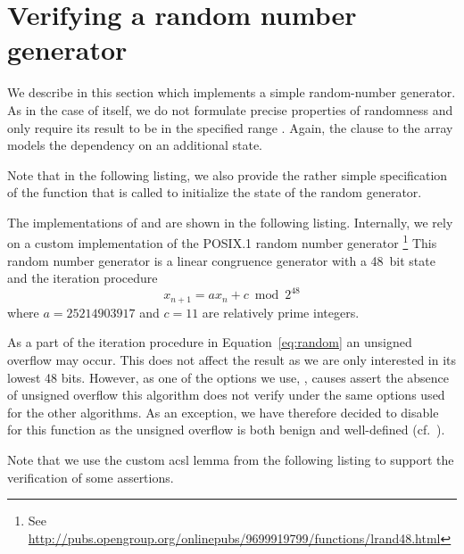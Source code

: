 
\section{Verifying a random number generator}

We describe in this section  which implements
a simple random-number generator.
As in the case of  itself, we do not formulate precise
properties of randomness and only require its result to
be in the specified range \inl{[0..n-1]}.
Again, the  clause to the array  models the
dependency on an additional state.

Note that in the following listing, we also provide the rather simple
specification of the function \randominit that is called to initialize the 
state of the random generator.



The implementations of \randomnumber and \randominit are shown in the following listing.
Internally, we rely on a custom implementation of the POSIX.1
random number generator \footnote{
  See \url{http://pubs.opengroup.org/onlinepubs/9699919799/functions/lrand48.html}
}
This random number generator is a linear congruence
generator with a 48~bit state and the iteration procedure
\begin{equation}
\label{eq:random}
x_{n+1}=ax_n+c\bmod 2^{48}
\end{equation}
%
where $a=25214903917$ and $c=11$ are relatively prime integers.

As a part of the iteration procedure in Equation~\eqref{eq:random}
an unsigned overflow may occur.
This does not affect the result as we are only interested in its lowest 48 bits.
However, as one of the options we use, ,
causes \wpframac  assert the absence of unsigned overflow this algorithm does not verify under
the same options used for the other algorithms.
%
As an exception, we have therefore decided to disable 
for this function as the unsigned overflow is both benign and
well-defined (cf.\ \cite[\S 6.2.5, 9]{isoc}).



Note that we use the custom acsl lemma 
from the following listing to support the verification of some assertions.



\clearpage

